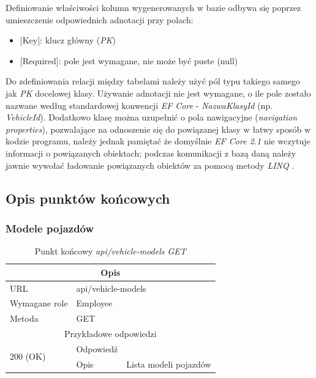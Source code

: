 \documentclass[eng,printmode,openany]{mgr}
\begin{document}
	Definiowanie właściwości kolumn wygenerowanych w bazie odbywa się poprzez umieszczenie odpowiednich adnotacji przy polach:
	\begin{itemize}
		\item $[$Key$]$: klucz główny (\textit{PK})
		\item $[$Required$]$: pole jest wymagane, nie może być puste (null)
	\end{itemize}
	Do zdefiniowania relacji między tabelami należy użyć pól typu takiego samego jak \textit{PK} docelowej klasy\cite{msdn-efcore-relationships}. Używanie adnotacji nie jest wymagane, o ile pole zostało nazwane według standardowej konwencji \textit{EF Core} - \textit{NazwaKlasyId} (np. \textit{VehicleId}). Dodatkowo klasę można uzupełnić o pola nawigacyjne (\textit{navigation properties}), pozwalające na odnoszenie się do powiązanej klasy w łatwy sposób w kodzie programu, należy jednak pamiętać że domyślnie \textit{EF Core 2.1} nie wczytuje informacji o powiązanych obiektach; podczas komunikacji z bazą daną należy jawnie wywołać ładowanie powiązanych obiektów za pomocą metody \textit{LINQ} .
	
	
	
	\subsection{Opis punktów końcowych}
	\subsubsection{Modele pojazdów}
	\begin{table}[H]
		\caption{Punkt końcowy \textit{api/vehicle-models GET}}
		\begin{tabularx}{\textwidth}{|l|l|X|}
			\hline
			\multicolumn{3}{|c|}{Opis}                         						\\ \hline
			URL                       & \multicolumn{2}{l|}{api/vehicle-models} 	\\ \hline
			Wymagane role             & \multicolumn{2}{l|}{Employee} \\ \hline
			Metoda                    & \multicolumn{2}{l|}{GET} 					\\ \hline
			\multicolumn{3}{|c|}{ Przykładowe odpowiedzi}                   		\\ \hline
			\multirow{2}{*}{200 (OK)} 			& Odpowiedź     &        \\ \cline{2-3} 
			& Opis         	& Lista modeli pojazdów       											\\ \hline
		\end{tabularx}
	\end{table}
	
\end{document}
